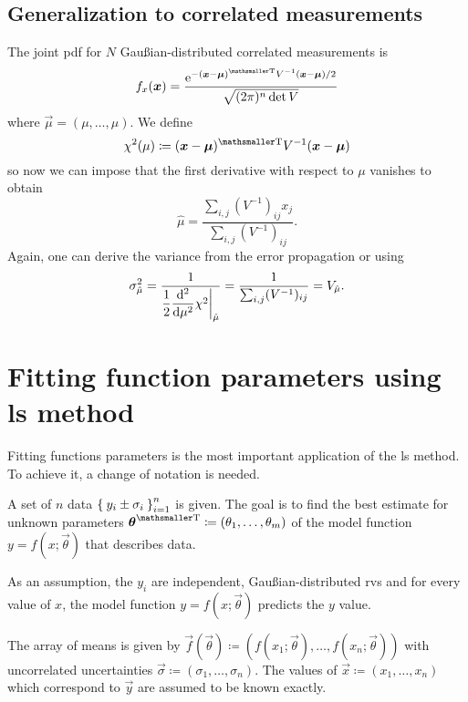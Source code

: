 \subsection{Generalization to correlated measurements}

The joint \ac{pdf} for $N$ Gau\ss{}ian-distributed correlated measurements is
\begin{equation}
	f_x(\vec{x}) = \frac{\eu^{-\transpose{(\vec{x}-\vec{\mu})}V^{-1}(\vec{x}-\vec{\mu})/2}}{\sqrt{(2\pi)^n\det V}}
\end{equation}
where $\vec{\mu} = (\mu,\dots,\mu)$.
We define
\begin{equation}
	\chi^2(\mu) \coloneqq \transpose{(\vec{x}-\vec{\mu})}V^{-1}(\vec{x}-\vec{\mu})
\end{equation}
so now we can impose that the first derivative with respect to $\mu$ vanishes to obtain
\begin{equation}
	\hat\mu = 
	\frac{\sum_{i,j}(V^{-1})_{ij}x_j}{\sum_{i,j}(V^{-1})_{ij}}.
\end{equation}
Again, one can derive the variance from the error propagation or using
\begin{equation}
	\sigma^2_{\hat\mu} = \frac{1}{\dfrac{1}{2} \deriv[2]{}{\mu}\chi^2\bigg\rvert_{\hat\mu}} = \frac{1}{\sum_{i,j} (V^{-1})_{ij}}   = V_{\hat\mu}.
\end{equation}



\section{Fitting function parameters using \acs{ls} method}

Fitting functions parameters is the most important application of the \ac{ls} method.
To achieve it, a change of notation is needed.


A set of $n$ data $\Set{y_i\pm\sigma_i}_{i=1}^n$ is given.
The goal is to find the best estimate for unknown parameters $\transpose{\vec{\theta}} \coloneqq (\theta_1,\dots,\theta_m)$ of the model function $y = f(x;\vec{\theta})$ that describes data.


As an assumption, the $y_i$ are independent, Gau\ss{}ian-distributed \acp{rv} and for every value of $x$, the model function $y=f(x;\vec{\theta})$ predicts the $y$ value.


The array of means is given by $\vec{f}(\vec{\theta}) \coloneqq (f(x_1;\vec{\theta}),\dots,f(x_n;\vec{\theta}))$ with uncorrelated uncertainties $\vec{\sigma}\coloneqq (\sigma_1,\dots,\sigma_n)$.
The values of $\vec{x}\coloneqq (x_1,\dots,x_n)$ which correspond to $\vec{y}$ are assumed to be known exactly.


